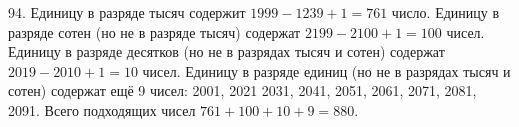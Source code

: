 94. Единицу в разряде тысяч содержит $1999-1239+1=761$ число. Единицу в разряде сотен (но не в разряде тысяч) содержат $2199-2100+1=100$ чисел. Единицу в разряде десятков (но не в разрядах тысяч и сотен) содержат $2019-2010+1=10$ чисел. Единицу в разряде единиц (но не в разрядах тысяч и сотен) содержат ещё 9 чисел: 2001, 2021 2031, 2041, 2051, 2061, 2071, 2081, 2091. Всего подходящих чисел $761+100+10+9=880.$\\

